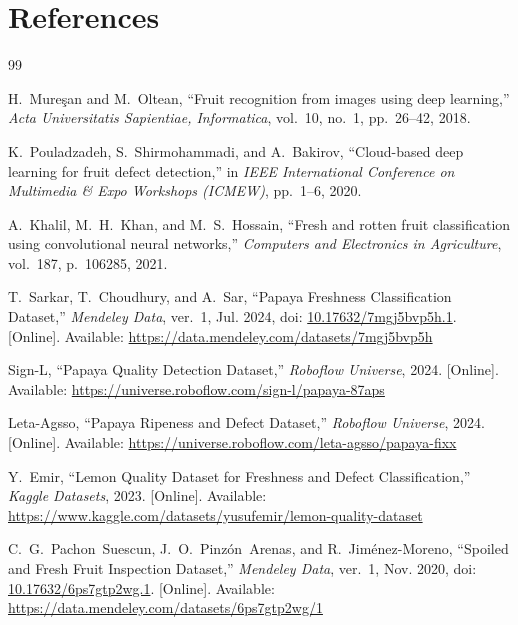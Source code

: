 \documentclass[11pt,a4paper]{article}
\begin{document}
\section{References}
\begin{thebibliography}{99}

H.~Mure\c{s}an and M.~Oltean, ``Fruit recognition from images using deep learning,'' \emph{Acta Universitatis Sapientiae, Informatica}, vol.~10, no.~1, pp.~26--42, 2018.

K.~Pouladzadeh, S.~Shirmohammadi, and A.~Bakirov, ``Cloud-based deep learning for fruit defect detection,'' in \emph{IEEE International Conference on Multimedia \& Expo Workshops (ICMEW)}, pp.~1--6, 2020.

A.~Khalil, M.~H.~Khan, and M.~S.~Hossain, ``Fresh and rotten fruit classification using convolutional neural networks,'' \emph{Computers and Electronics in Agriculture}, vol.~187, p.~106285, 2021.


T.~Sarkar, T.~Choudhury, and A.~Sar, ``Papaya Freshness Classification Dataset,'' \emph{Mendeley Data}, ver.~1, Jul. 2024, doi: \href{https://doi.org/10.17632/7mgj5bvp5h.1}{10.17632/7mgj5bvp5h.1}. [Online]. Available: \url{https://data.mendeley.com/datasets/7mgj5bvp5h}

Sign-L, ``Papaya Quality Detection Dataset,'' \emph{Roboflow Universe}, 2024. [Online]. Available: \url{https://universe.roboflow.com/sign-l/papaya-87aps}

Leta-Agsso, ``Papaya Ripeness and Defect Dataset,'' \emph{Roboflow Universe}, 2024. [Online]. Available: \url{https://universe.roboflow.com/leta-agsso/papaya-fixx}


Y.~Emir, ``Lemon Quality Dataset for Freshness and Defect Classification,'' \emph{Kaggle Datasets}, 2023. [Online]. Available: \url{https://www.kaggle.com/datasets/yusufemir/lemon-quality-dataset}

C.~G.~Pachon~Suescun, J.~O.~Pinz\'on~Arenas, and R.~Jim\'enez-Moreno, ``Spoiled and Fresh Fruit Inspection Dataset,'' \emph{Mendeley Data}, ver.~1, Nov. 2020, doi: \href{https://doi.org/10.17632/6ps7gtp2wg.1}{10.17632/6ps7gtp2wg.1}. [Online]. Available: \url{https://data.mendeley.com/datasets/6ps7gtp2wg/1}


\end{thebibliography}
\end{document}
